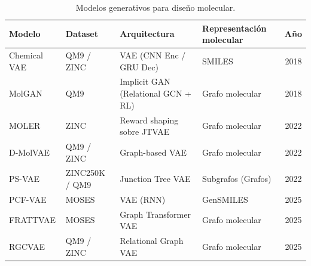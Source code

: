 \begin{table}[htbp]
    \centering
    \caption{Modelos generativos para diseño molecular.}
    \label{tab:modelos}
    \begin{tabularx}{\textwidth}{l l >{\raggedright\arraybackslash}X >{\raggedright\arraybackslash}X c}
        \toprule
        \textbf{Modelo} & \textbf{Dataset} & \textbf{Arquitectura} & \textbf{Representación molecular} & \textbf{Año} \\
        \midrule
        Chemical VAE & QM9 / ZINC & VAE (CNN Enc / GRU Dec) & SMILES & 2018 \\
        MolGAN & QM9 & Implicit GAN (Relational GCN + RL) & Grafo molecular & 2018 \\
        MOLER & ZINC & Reward shaping sobre JTVAE & Grafo molecular & 2022 \\
        D-MolVAE & QM9 / ZINC & Graph-based VAE & Grafo molecular & 2022 \\
        PS-VAE & ZINC250K / QM9 & Junction Tree VAE & Subgrafos (Grafos) & 2022 \\
        PCF-VAE & MOSES & VAE (RNN) & GenSMILES & 2025 \\
        FRATTVAE & MOSES & Graph Transformer VAE & Grafo molecular & 2025 \\
        RGCVAE & QM9 / ZINC & Relational Graph VAE & Grafo molecular & 2025 \\
        \bottomrule
    \end{tabularx}
\end{table}

